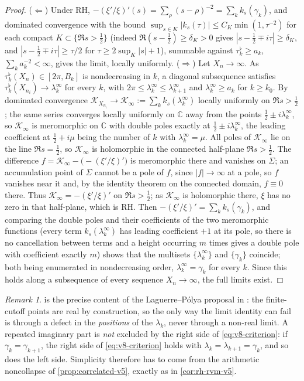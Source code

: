 \documentclass[11pt,a4paper]{article}
\numberwithin{equation}{section}
\theoremstyle{definition}
\theoremstyle{remark}
\newtheorem{remark}[theorem]{Remark}
\begin{document}
\begin{proof}
($\Leftarrow$) Under RH, $-(\xi'/\xi)'(s)=\sum_\rho(s-\rho)^{-2}=\sum_kk_s(\gamma_k)$,
and dominated convergence with the bound
$\sup_{s\in K}|k_s(\tau)|\le C_K\min(1,\tau^{-2})$ for each compact $K\subset\{\Re s>\frac12\}$ (indeed $\Re(s-\frac12)\ge\delta_K>0$ gives $|s-\frac12\mp i\tau|\ge\delta_K$, and $|s-\frac12\mp i\tau|\ge\tau/2$ for $\tau\ge2\sup_K|s|+1$), summable against $\tau_k^\flat\ge a_k$, $\sum_ka_k^{-2}<\infty$, gives the limit, locally uniformly.
($\Rightarrow$) Let $X_n\to\infty$. As $\tau_k^\flat(X_n)\in[2\pi,B_k]$
is nondecreasing in $k$, a diagonal subsequence satisfies
$\tau_k^\flat(X_{n_i})\to\lambda^\infty_k$ for every $k$, with
$2\pi\le\lambda^\infty_k\le\lambda^\infty_{k+1}$ and $\lambda^\infty_k\ge a_k$ for $k\ge k_0$.
By dominated convergence $\mathcal K_{X_{n_i}}\to\mathcal K_\infty:=\sum_kk_s(\lambda^\infty_k)$
locally uniformly on $\Re s>\frac12$; the same series converges locally
uniformly on $\mathbb C$ away from the points $\frac12\pm i\lambda^\infty_k$, so
$\mathcal K_\infty$ is meromorphic on $\mathbb C$ with double poles
exactly at $\frac12\pm i\lambda^\infty_k$, the leading coefficient at
$\frac12+i\mu$ being the number of $k$ with $\lambda^\infty_k=\mu$. All poles of $\mathcal K_\infty$ lie on the line $\Re s=\frac12$, so $\mathcal K_\infty$ is holomorphic in the connected half-plane $\Re s>\frac12$. The difference $f=\mathcal K_\infty-\bigl(-(\xi'/\xi)'\bigr)$ is meromorphic there and vanishes on $\Sigma$; an accumulation point of $\Sigma$ cannot be a pole of $f$, since $|f|\to\infty$ at a pole, so $f$ vanishes near it and, by the identity theorem on the connected domain, $f\equiv0$ there. Thus
$\mathcal K_\infty=-(\xi'/\xi)'$ on $\Re s>\frac12$; as
$\mathcal K_\infty$ is holomorphic there, $\xi$ has no zero in that
half-plane, which is RH. Then $-(\xi'/\xi)'=\sum_kk_s(\gamma_k)$, and
comparing the double poles and their coefficients of the two meromorphic
functions (every term $k_s(\lambda^\infty_k)$ has leading coefficient $+1$ at its pole, so there is no cancellation between terms and a height occurring $m$ times gives a double pole with coefficient exactly $m$) shows that the multisets $\{\lambda^\infty_k\}$ and $\{\gamma_k\}$
coincide; both being enumerated in nondecreasing order,
$\lambda^\infty_k=\gamma_k$ for every $k$. Since this holds along a subsequence
of every sequence $X_n\to\infty$, the full limits exist.
\end{proof}

\begin{remark}
 is the precise content of the
Laguerre--P\'olya proposal in \cite{CasanaV10Notes}: the finite-cutoff
points are real by construction, so the only way the limit identity can
fail is through a defect in the \emph{positions} of the $\lambda_k$,
never through a non-real limit. A repeated imaginary part is
\emph{not} excluded by the right side of \eqref{eq:v8-criterion}: if
$\gamma_k=\gamma_{k+1}$, the right side of \eqref{eq:v8-criterion} holds with $\lambda_k=\lambda_{k+1}=\gamma_k$, and so does the left side. Simplicity therefore has to come from the arithmetic
noncollapse of \cref{prop:correlated-v5}, exactly as in
\cref{cor:rh-rvm-v5}.
\end{remark}
\end{document}
